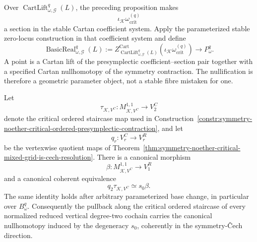 \begin{definition}
\label{def:symmetry-noether-internal-presymplectic-basicness-object}
Over $\operatorname{CartLift}_{\omega,\mathcal G}^{q}(L)$, the preceding
proposition makes
\[
\iota_{\mathcal K}\omega_{\mathrm{crit}}^{(q)}
\]
a section in the stable Cartan coefficient system.  Apply the parameterized stable
zero-locus construction in that coefficient system and define
\[
\boxed{
\operatorname{BasicReal}_{\omega,\mathcal G}^{q}(L)
:=
Z^{\mathrm{Cart}}_{\operatorname{CartLift}_{\omega,\mathcal G}^{q}(L)}
\left(
\iota_{\mathcal K}\omega_{\mathrm{crit}}^{(q)}
\right)
\longrightarrow
P_\omega^q.
}
\]
A point is a Cartan lift of the presymplectic coefficient--section pair together
with a specified Cartan nullhomotopy of the symmetry contraction.  The nullification
is therefore a geometric parameter object, not a stable fibre mistaken for one.
\end{definition}


\begin{lemma}
\label{lem:symmetry-noether-quotient-degeneracy-of-critical-ordered-staircase}
Let
\[
\tau_{\mathcal K,V^C}:
M_{\mathcal K,V^C}^{1,1}
\longrightarrow
V^C_2
\]
denote the critical ordered staircase map used in
Construction~\ref{constr:symmetry-noether-critical-ordered-presymplectic-contraction},
and let
\[
q_r:V^C_r\longrightarrow V^R_r
\]
be the vertexwise quotient maps of
Theorem~\ref{thm:symmetry-noether-critical-mixed-grid-is-cech-resolution}.  There is
a canonical morphism
\[
\beta:
M_{\mathcal K,V^C}^{1,1}
\longrightarrow
V^R_1
\]
and a canonical coherent equivalence
\[
\boxed{
q_2\tau_{\mathcal K,V^C}
\simeq
s_0\beta.
}
\]
The same identity holds after arbitrary parameterized base change, in particular
over $B_\omega^q$.  Consequently the pullback along the critical ordered staircase
of every normalized reduced vertical degree-two cochain carries the canonical
nullhomotopy induced by the degeneracy $s_0$, coherently in the symmetry-\v{C}ech
direction.
\end{lemma}

